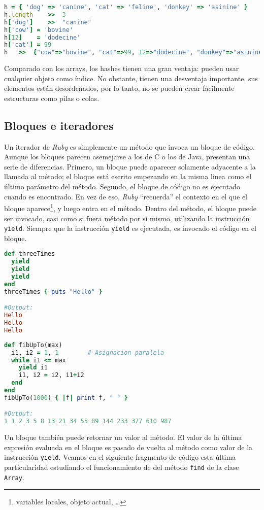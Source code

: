 \begin{lstlisting}[language=Ruby]
h = { 'dog' => 'canine', 'cat' => 'feline', 'donkey' => 'asinine' }
h.length	>>	3
h['dog']	>>	"canine"
h['cow'] = 'bovine'
h[12]    = 'dodecine'
h['cat'] = 99
h	>>	{"cow"=>"bovine", "cat"=>99, 12=>"dodecine", "donkey"=>"asinine", "dog"=>"canine"}
\end{lstlisting}

Comparado con los arrays, los hashes tienen una gran ventaja: pueden usar cualquier objeto como índice. No obstante, tienen una desventaja importante, sus elementos están desordenados, por lo tanto, no se pueden crear fácilmente estructuras como pilas o colas.

\subsection{Bloques e iteradores}
Un iterador de \textit{Ruby} es simplemente un método que invoca un bloque de código. Aunque los bloques parecen asemejarse a los de C o los de Java, presentan una serie de diferencias. Primero, un bloque puede aparecer solamente adyacente a la llamada al método; el bloque está escrito empezando en la misma linea como el último parámetro del método. Segundo, el bloque de código no es ejecutado cuando es encontrado. En vez de eso, \textit{Ruby} ``recuerda'' el contexto en el que el bloque aparece\footnote{variables locales, objeto actual, \ldots}, y luego entra en el método.
Dentro del método, el bloque puede ser invocado, casi como si fuera método por si mismo, utilizando la instrucción \texttt{yield}. Siempre que la instrucción \texttt{yield} es ejecutada, es invocado el código en el bloque.

\begin{lstlisting}[language=Ruby]
def threeTimes
  yield
  yield
  yield
end
threeTimes { puts "Hello" }

#Output:
Hello
Hello
Hello
\end{lstlisting}

\begin{lstlisting}[language=Ruby]
def fibUpTo(max)
  i1, i2 = 1, 1        # Asignacion paralela
  while i1 <= max
    yield i1
    i1, i2 = i2, i1+i2
  end
end
fibUpTo(1000) { |f| print f, " " }

#Output:
1 1 2 3 5 8 13 21 34 55 89 144 233 377 610 987
\end{lstlisting}

Un bloque también puede retornar un valor al método. El valor de la última expresión evaluada en el bloque es pasado de vuelta al método como valor de la instrucción \texttt{yield}. Veamos en el siguiente fragmento de código esta última particularidad estudiando el funcionamiento de del método \texttt{find} de la clase \texttt{Array}.

